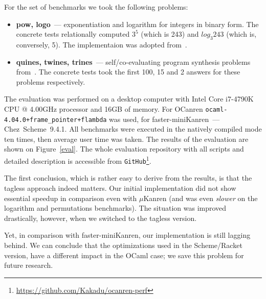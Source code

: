 \FloatBarrier

For the set of benchmarks we took the following problems:

\begin{itemize}
\item \textbf{pow, logo}~--- exponentiation and logarithm for integers in binary form. The concrete tests relationally computed
$3^5$ (which is 243) and $log_3 243$ (which is, conversely, 5). The implementaion was adopted from~\cite{KiselyovArithm}.
\item \textbf{quines, twines, trines}~--- self/co-evaluating program synthesis problems from~\cite{Untagged}. The
concrete tests took the first 100, 15 and 2 answers for these problems respectively.
\end{itemize}


The evaluation was performed on a desktop computer with Intel Core i7-4790K CPU @ 4.00GHz processor and 16GB of memory.
For OCanren \texttt{ocaml-4.04.0+frame\_pointer+flambda} was used,
for faster-miniKanren~--- Chez~Scheme~9.4.1.
All benchmarks were executed in the natively compiled mode ten times, then average user time was taken. The results of the evaluation
are shown on Figure~\ref{eval}. The whole evaluation repository with all scripts and detailed description is accessible
from \lstinline|GitHub|\footnote{\url{https://github.com/Kakadu/ocanren-perf}}.

The first conclusion, which is rather easy to derive from the results, is that the tagless approach indeed matters. Our initial
implementation did not show essential speedup in comparison even with $\mu$Kanren (and was even \emph{slower} on the logarithm
and permutations benchmarks). The situation was improved drastically, however, when we switched to the tagless version.

Yet, in comparison with faster-miniKanren, our implementation is still lagging behind. We can conclude that the optimizations
used in the Scheme/Racket version, have a different impact in the OCaml case; we save this problem for future research.

